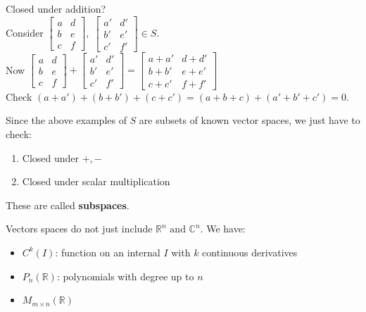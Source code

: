 \documentclass[../main.tex]{subfiles}
\begin{document}
\begin{example}
    Closed under addition? \checkmark \\
    Consider \( \begin{bmatrix} a & d \\ b & e \\ c & f \end{bmatrix}, \; \begin{bmatrix} a' & d' \\ b' & e' \\ c' & f' \end{bmatrix} \in S\). \\
    Now \( \begin{bmatrix} a & d \\ b & e \\ c & f \end{bmatrix} + \begin{bmatrix} a' & d' \\ b' & e' \\ c' & f' \end{bmatrix} =
    \begin{bmatrix} a+a' & d+d' \\ b+b' & e+e' \\ c+c' & f+f' \end{bmatrix} \) \\
    Check \( (a+a') + (b+b') + (c+c') = (a+b+c) + (a'+b'+c') = 0 \).
\end{example}

\begin{note}
    Since the above examples of \( S \) are subsets of known vector spaces, we just have to check:
    \begin{enumerate}
        \item Closed under \( +,- \)
        \item Closed under scalar multiplication
    \end{enumerate}

    These are called \textbf{subspaces}.
\end{note}

Vectors spaces do not just include \( \mathbb{R}^n \text{ and } \mathbb{C}^n \).
We have:
\begin{itemize}
    \item \( C^k(I) \): function on an internal \( I \) with \( k \) continuous derivatives
    \item \( P_n(\mathbb{R}) \): polynomials with degree up to \( n \)
    \item \( M_{m \times n}(\mathbb{R}) \)
\end{itemize}
\end{document}

